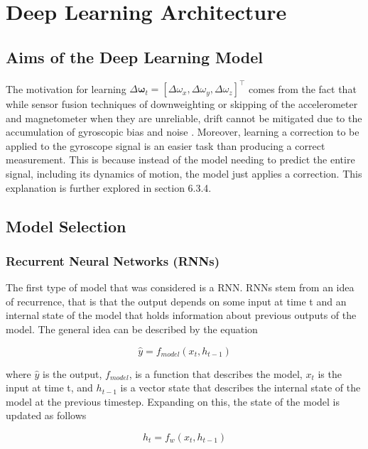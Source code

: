 \newpage
\section{Deep Learning Architecture}



\subsection{Aims of the Deep Learning Model}
The motivation for learning $\Delta\boldsymbol{\omega}_t = [\Delta\omega_x,\Delta\omega_y,\Delta\omega_z]^\top$ 
comes from the fact that while sensor fusion techniques of downweighting 
or skipping of the accelerometer and magnetometer when they are unreliable, drift cannot be mitigated due to the accumulation of gyroscopic bias 
and noise \cite{zhang_2012_quaternionbased}\cite{bo_2023_robust}. Moreover, learning a correction to be applied to the gyroscope signal is an
easier task than producing a correct measurement. This is because instead of the model needing to predict the entire signal, including its 
dynamics of motion, the model just applies a correction. This explanation is further explored in section 6.3.4.

\subsection{Model Selection}
\subsubsection{Recurrent Neural Networks (RNNs)}
The first type of model that was considered is a RNN. RNNs stem from an 
idea of recurrence, that is that the output depends on some input at time
t and an internal state of the model that holds information about previous
outputs of the model. The general idea can be described by the equation

\begin{equation}
\hat{y} = f_{model}(x_t, h_{t-1})
\end{equation}

where $\hat{y}$ is the output, $f_{model}$, is a function that describes the model,
$x_t$ is the input at time t, and $h_{t-1}$ is a vector state that
describes the internal state of the model at the previous timestep. Expanding
on this, the state of the model is updated as follows

\begin{equation}
h_t = f_w(x_t, h_{t-1})
\end{equation}

